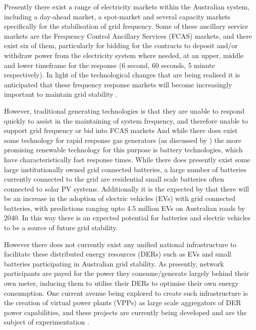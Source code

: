 Presently there exist a range of electricity markets within the Australian system, including a day-ahead market, a spot-market and several capacity markets specifically for the stabilisation of grid frequency.
Some of these ancillary service markets are the Frequency Control Ancillary Services (FCAS) markets, and there exist six of them, particularly for bidding for the contracts to deposit and/or withdraw power from the electricity system where needed, at an upper, middle and lower timeframe for the response (6 second, 60 seconds, 5 minute respectively).
In light of the technological changes that are being realised it is anticipated that these frequency response markets will become increasingly important to maintain grid stability \citep{RIESZ201586}.

However, \DIFdelbegin {}\DIFdelend \DIFaddbegin {}\DIFaddend traditional generating technologies \DIFaddbegin {}\DIFaddend is that they are \DIFdelbegin {}\DIFdelend unable to respond quickly to assist in the maintaining of system frequency, and therefore unable to support grid frequency or bid into FCAS markets \DIFdelbegin {}\DIFdelend \DIFaddbegin {}\DIFaddend And while there does exist some technology for rapid response gas generators (as discussed by \cite{GONZALEZSALAZAR20181497}) the more promising renewable technology for this purpose is battery technologies, which have characteristically fast response times.
While there does presently exist some large institutionally owned grid connected batteries, a large number of batteries currently connected to the grid are residential small scale batteries often connected to solar PV systems.
Additionally it is the expected by \cite{australianenergymarketoperatorlimited2019} that there will be an increase in the adoption of electric vehicles (EVs) with grid connected batteries, with predictions ranging upto 4.5 million EVs on Australian roads by 2040.
In this way there is an expected potential for batteries and electric vehicles to be a source of future grid stability.

However there does not currently exist any unified national infrastructure to facilitate these distributed energy resources (DERs) such as EVs and small batteries participating in Australian grid stability.
As presently, network participants are payed for the power they consume/generate largely behind their own meter, inducing them to utilise their DERs to optimise their own energy consumption.
One current avenue being explored to create such infrastructure is the creation of virtual power plants (VPPs) as large scale aggregators of DER power capabilities, and these projects are currently being developed and are the subject of experimentation \citep{australianenergymarketoperatorlimited20188}.
\DIFdelbegin %


